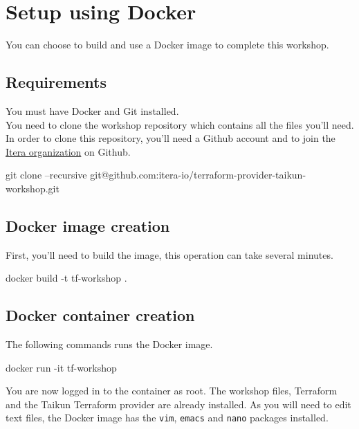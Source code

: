 \section{Setup using Docker}\label{sec:docker}

You can choose to build and use a Docker image to complete this workshop.

\subsection{Requirements}

You must have Docker and Git installed.\\
You need to clone the workshop repository which contains all the files you'll need.\\
In order to clone this repository, you'll need a Github account and to join the \href{https://github.com/itera-io}{Itera organization} on Github.

\begin{shell}
git clone --recursive git@github.com:itera-io/terraform-provider-taikun-workshop.git
\end{shell}

\subsection{Docker image creation}

First, you'll need to build the image, this operation can take several minutes.

\begin{shell}
docker build -t tf-workshop .
\end{shell}

\subsection{Docker container creation}

The following commands runs the Docker image.
\begin{shell}
docker run -it tf-workshop
\end{shell}
You are now logged in to the container as root. The workshop files,
Terraform and the Taikun Terraform provider are already installed.
As you will need to edit text files, the Docker image has the \texttt{vim}, \texttt{emacs} and \texttt{nano}
packages installed.
